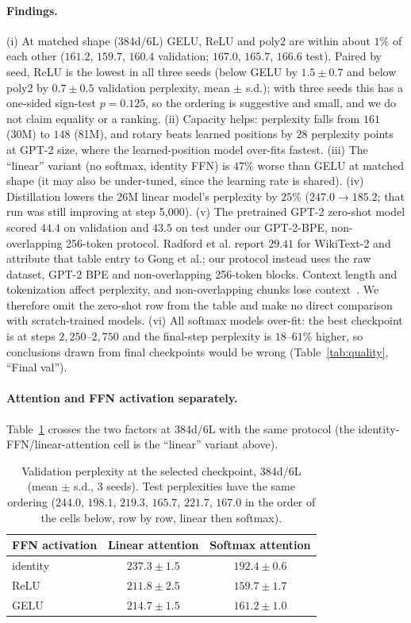 \documentclass[10pt]{article}
\begin{document}
\paragraph{Findings.}
(i) At matched shape (384d/6L) GELU, ReLU and poly2 are within about $1\%$ of
each other ($161.2$, $159.7$, $160.4$ validation; $167.0$, $165.7$, $166.6$ test).
Paired by seed, ReLU is the lowest in all three seeds (below GELU by $1.5\pm0.7$
and below poly2 by $0.7\pm0.5$ validation perplexity, mean $\pm$ s.d.); with
three seeds this has a one-sided sign-test $p{=}0.125$, so the ordering is
suggestive and small, and we do not claim equality or a ranking. (ii) Capacity helps: perplexity falls from $161$ (30M) to
$148$ (81M), and rotary beats learned positions by $28$ perplexity points at GPT-2
size, where the learned-position model over-fits fastest. (iii) The ``linear''
variant (no softmax, identity FFN) is $47\%$ worse than GELU at matched shape
(it may also be under-tuned, since the learning rate is shared).
(iv) Distillation lowers the 26M linear model's perplexity by $25\%$
($247.0\to185.2$; that run was still improving at step 5{,}000). (v) The pretrained GPT-2 zero-shot model scored $44.4$ on validation and $43.5$
on test under our GPT-2-BPE, non-overlapping 256-token protocol. Radford et al. report $29.41$ for WikiText-2 and attribute that table entry
to Gong et al.; our protocol instead uses the raw dataset, GPT-2 BPE and
non-overlapping 256-token blocks. Context length and tokenization affect
perplexity, and non-overlapping chunks lose context~\citep{radford2019gpt2,hfperplexity}. We therefore omit the zero-shot
row from the table and make no direct comparison with scratch-trained models. (vi) All softmax
models over-fit: the best checkpoint is at steps $2{,}250$--$2{,}750$ and the
final-step perplexity is $18$--$61\%$ higher, so conclusions drawn from final
checkpoints would be wrong (Table~\ref{tab:quality}, ``Final val'').

\paragraph{Attention and FFN activation separately.}
Table~\ref{tab:dq} crosses the two factors at 384d/6L with the same protocol
(the identity-FFN/linear-attention cell is the ``linear'' variant above).

\begin{table}[t]
\centering
\caption{Validation perplexity at the selected checkpoint, 384d/6L (mean $\pm$
  s.d., 3 seeds). Test perplexities have the same ordering ($244.0$, $198.1$,
  $219.3$, $165.7$, $221.7$, $167.0$ in the order of the cells below, row by row,
  linear then softmax).}
\label{tab:dq}
\begin{tabular}{lcc}
\toprule
FFN activation & Linear attention & Softmax attention \\
\midrule
identity & $237.3\pm1.5$ & $192.4\pm0.6$ \\
ReLU     & $211.8\pm2.5$ & $159.7\pm1.7$ \\
GELU     & $214.7\pm1.5$ & $161.2\pm1.0$ \\
\bottomrule
\end{tabular}
\end{table}
\end{document}

